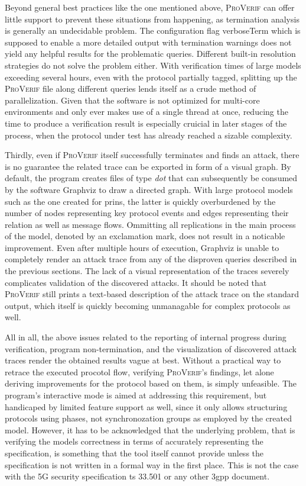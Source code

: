 Beyond general best practices like the one mentioned above, \textsc{ProVerif} can offer little support to prevent these situations from happening, as termination analysis is generally an undecidable problem.
The configuration flag {\sffamily verboseTerm} which is supposed to enable a more detailed output with termination warnings does not yield any helpful results for the problematic queries.
Different built-in resolution strategies do not solve the problem either.
With verification times of large models exceeding several hours, even with the protocol partially tagged, splitting up the \textsc{ProVerif} file along different queries lends itself as a crude method of parallelization.
Given that the software is not optimized for multi-core environments and only ever makes use of a single thread at once, reducing the time to produce a verification result is especially cruicial in later stages of the process, when the protocol under test has already reached a sizable complexity.\medskip

Thirdly, even if \textsc{ProVerif} itself successfully terminates and finds an attack, there is no guarantee the related trace can be exported in form of a visual graph.
By default, the program creates files of type \textit{dot} that can subsequently be consumed by the software Graphviz to draw a directed graph.
With large protocol models such as the one created for \gls{prins}, the latter is quickly overburdened by the number of nodes representing key protocol events and edges representing their relation as well as message flows.
Ommitting all replications in the main process of the model, denoted by an exclamation mark, does not result in a noticable improvement.
Even after multiple hours of execution, Graphviz is unable to completely render an attack trace from any of the disproven queries described in the previous sections.
The lack of a visual representation of the traces severely complicates validation of the discovered attacks.
It should be noted that \textsc{ProVerif} still prints a text-based description of the attack trace on the standard output, which itself is quickly becoming unmanagable for complex protocols as well.\medskip

All in all, the above issues related to the reporting of internal progress during verification, program non-termination, and the visualization of discovered attack traces render the obtained results vague at best.
Without a practical way to retrace the executed procotol flow, verifying \textsc{ProVerif}'s findings, let alone deriving improvements for the protocol based on them, is simply unfeasible.
The program's interactive mode is aimed at addressing this requirement, but handicaped by limited feature support as well, since it only allows structuring protocols using phases, not synchronozation groups as employed by the created model.
However, it has to be acknowledged that the underlying problem, that is verifying the models correctness in terms of accurately representing the specification, is something that the tool itself cannot provide unless the specification is not written in a formal way in the first place.
This is not the case with the 5G security specification \gls{ts} 33.501 or any other \gls{3gpp} document.
